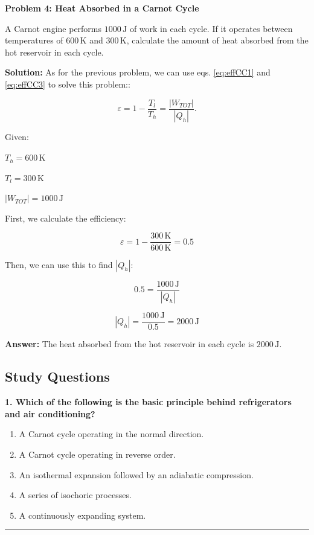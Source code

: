 \documentclass[
  9pt,
]{extbook}
\providecommand{\tightlist}{%
  \setlength{\itemsep}{0pt}\setlength{\parskip}{0pt}}
\theoremstyle{definition}
\theoremstyle{definition}
\theoremstyle{definition}
\theoremstyle{remark}
\begin{document}
\textbf{Problem 4: Heat Absorbed in a Carnot Cycle}

A Carnot engine performs \(1000\,\text{J}\) of work in each cycle. If it operates between temperatures of \(600\,\text{K}\) and \(300\,\text{K}\), calculate the amount of heat absorbed from the hot reservoir in each cycle.

\textbf{Solution:} As for the previous problem, we can use eqs. \eqref{eq:effCC1} and \eqref{eq:effCC3} to solve this problem::

\[\varepsilon = 1 - \frac{T_l}{T_h} = \frac{|W_{TOT}|}{|Q_h|}.\]

Given:

\(T_h = 600\,\text{K}\)

\(T_l = 300\,\text{K}\)

\(|W_{TOT}| = 1000\,\text{J}\)

First, we calculate the efficiency:

\[\varepsilon = 1 - \frac{300\,\text{K}}{600\,\text{K}} = 0.5\]

Then, we can use this to find \(|Q_h|\):

\[0.5 = \frac{1000\,\text{J}}{|Q_h|}\]

\[|Q_h| = \frac{1000\,\text{J}}{0.5} = 2000\,\text{J}\]

\textbf{Answer:} The heat absorbed from the hot reservoir in each cycle is \(2000 \,\text{J}\).

\hypertarget{quest5}{%
\subsection{Study Questions}\label{quest5}}

\textbf{1. Which of the following is the basic principle behind refrigerators and air conditioning?}

\begin{enumerate}
\def\labelenumi{\alph{enumi}.}
\tightlist
\item
  A Carnot cycle operating in the normal direction.
\item
  A Carnot cycle operating in reverse order.
\item
  An isothermal expansion followed by an adiabatic compression.
\item
  A series of isochoric processes.
\item
  A continuously expanding system.
\end{enumerate}

\begin{center}\rule{0.5\linewidth}{0.5pt}\end{center}
\end{document}
